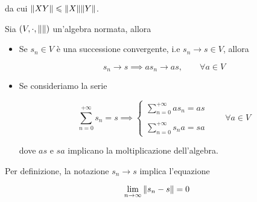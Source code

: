 da cui $ \norm{X Y} \leqslant \norm{X} \norm{Y} $.

\begin{definition}
	Sia $ (V,\cdot,\norm{}) $ un'algebra normata, allora
	
	\begin{itemize}
		\item Se $ s_{n} \in V $ è una successione convergente, i.e $ s_{n} \to s \in V $, allora
		
		\begin{equation}
			s_{n} \to s \implies a s_{n} \to a s, \qquad \forall a \in V
		\end{equation}
	
		\item Se consideriamo la serie
		
		\begin{equation}
			\sum_{n=0}^{+\infty} s_{n} = s %
			\implies%
			\begin{cases}
				\displaystyle \sum_{n=0}^{+\infty} a s_{n} = a s\\\\
				\displaystyle \sum_{n=0}^{+\infty} s_{n} a = s a
			\end{cases}
			\qquad \forall a \in V
		\end{equation}
	
		dove $ a s $ e $ s a $ implicano la moltiplicazione dell'algebra.
	\end{itemize}
\end{definition}

Per definizione, la notazione $ s_{n} \to s $ implica l'equazione

\begin{equation}
	\lim_{n \to \infty} \norm{s_{n} - s} = 0
\end{equation}

